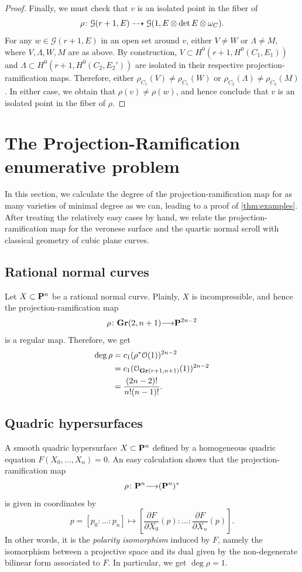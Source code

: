 \documentclass[11pt,reqno]{amsart}
\theoremstyle{plain}
\theoremstyle{definition}
\theoremstyle{remark}
\numberwithin{equation}{section}
\renewcommand{\to}{{\longrightarrow}}
\numberwithin{equation}{section}
\renewcommand{\O}{\mathcal O}
\begin{document}
\begin{proof}
  Finally, we must check that $v$ is an isolated point in the fiber of
  \[ \rho \from \mathcal G(r+1, E) \dashrightarrow \mathcal G(1, E \otimes \det E \otimes \omega_C).\]
  For any $w \in \mathcal G(r+1, E)$ in an open set around $v$, either $V \neq W$ or $\Lambda \neq M$, where $V, \Lambda, W, M$ are as above.
  By construction, $V \subset H^0(r+1, H^0(C_1, E_1))$ and $\Lambda \subset H^0(r+1, H^0(C_2, E_2'))$ are isolated in their respective projection-ramification maps.
  Therefore, either $\rho_{C_1} (V) \neq \rho_{C_1}(W)$ or $\rho_{C_2}(\Lambda) \neq \rho_{C_2}(M)$.
  In either case, we obtain that $\rho(v) \neq \rho(w)$, and hence conclude that $v$ is an isolated point in the fiber of $\rho$.
\end{proof}


\section{The Projection-Ramification enumerative problem} %
\label{sec:enumerativeproblems}
In this section, we calculate the degree of the projection-ramification map for as many varieties of minimal degree as we can, leading to a proof of \autoref{thm:examples}.
After treating the relatively easy cases by hand, we relate the projection-ramification map for the veronese surface and the quartic normal scroll with classical geometry of cubic plane curves.

\subsection{Rational normal curves}
\label{sec:arnc}
Let $X \subset \P^n$ be a rational normal curve.
Plainly, $X$ is incompressible, and hence the projection-ramification map
\[ \rho \from \Gr(2, n+1) \to \P^{2n-2}\]
is a regular map.
Therefore, we get
\begin{align*}
  \deg \rho &= c_1(\rho^* \O(1))^{2n-2}\\
            &= c_1(\O_{\Gr(r+1, n+1)}(1))^{2n-2} \\
            &= \frac{(2n-2)!}{n!(n-1)!}.
\end{align*}

\subsection{Quadric hypersurfaces} %
\label{sec:aquadricsurface}
A smooth quadric hypersurface $X \subset \P^{n}$ defined by a homogeneous quadric equation $F(X_{0},\dots,X_n) = 0$.
An easy calculation shows that the projection-ramification map
\[ \rho \from \P^n \to (\P^n)^*\]
is given in coordinates by
\[ p = [p_0: \dots:p_n] \mapsto \left[ \frac{\partial F}{\partial X_0}(p): \dots: \frac{\partial F}{\partial X_n}(p) \right].\]
In other words, it is the \emph{polarity isomorphism} induced by $F$, namely the isomorphism between a projective space and its dual given by the non-degenerate bilinear form associated to $F$.
In particular, we get $\deg \rho = 1$.
\end{document}
